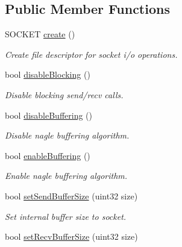 \subsection*{\-Public \-Member \-Functions}
\begin{DoxyCompactItemize}
\item 
\-S\-O\-C\-K\-E\-T \hyperlink{classSocketOperations_a542d416133a25018961be5703cc82d8f}{create} ()
\begin{DoxyCompactList}\small\item\em \-Create file descriptor for socket i/o operations. \end{DoxyCompactList}\item 
\hypertarget{classSocketOperations_a342adc61aee2904e6b6b2b650ee30c64}{bool \hyperlink{classSocketOperations_a342adc61aee2904e6b6b2b650ee30c64}{disable\-Blocking} ()}\label{classSocketOperations_a342adc61aee2904e6b6b2b650ee30c64}

\begin{DoxyCompactList}\small\item\em \-Disable blocking send/recv calls. \end{DoxyCompactList}\item 
\hypertarget{classSocketOperations_afa7bbc20f36191bb502975072f1c1bcf}{bool \hyperlink{classSocketOperations_afa7bbc20f36191bb502975072f1c1bcf}{disable\-Buffering} ()}\label{classSocketOperations_afa7bbc20f36191bb502975072f1c1bcf}

\begin{DoxyCompactList}\small\item\em \-Disable nagle buffering algorithm. \end{DoxyCompactList}\item 
\hypertarget{classSocketOperations_a136fe3ab807a04ae165f90f034d27628}{bool \hyperlink{classSocketOperations_a136fe3ab807a04ae165f90f034d27628}{enable\-Buffering} ()}\label{classSocketOperations_a136fe3ab807a04ae165f90f034d27628}

\begin{DoxyCompactList}\small\item\em \-Enable nagle buffering algorithm. \end{DoxyCompactList}\item 
\hypertarget{classSocketOperations_a5ad20ec31c2576776c1ff2d1a69a6bda}{bool \hyperlink{classSocketOperations_a5ad20ec31c2576776c1ff2d1a69a6bda}{set\-Send\-Buffer\-Size} (uint32 size)}\label{classSocketOperations_a5ad20ec31c2576776c1ff2d1a69a6bda}

\begin{DoxyCompactList}\small\item\em \-Set internal buffer size to socket. \end{DoxyCompactList}\item 
\hypertarget{classSocketOperations_a1211a4834c1a9cc56023d6ac503be8e2}{bool \hyperlink{classSocketOperations_a1211a4834c1a9cc56023d6ac503be8e2}{set\-Recv\-Buffer\-Size} (uint32 size)}\label{classSocketOperations_a1211a4834c1a9cc56023d6ac503be8e2}


\end{DoxyCompactItemize}
